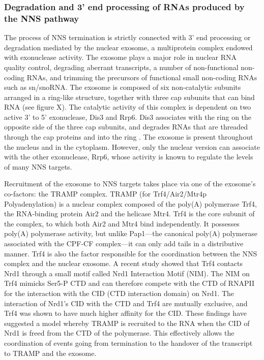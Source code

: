 \subsubsection{Degradation and 3' end processing of RNAs produced by the NNS pathway}

The process of NNS termination is strictly connected with 3' end processing or degradation mediated by the nuclear exosome, a multiprotein complex endowed with exonuclease activity. 
The exosome plays a major role in nuclear RNA quality control, degrading aberrant transcripts, a number of non-functional non-coding RNAs, and trimming the precursors of functional small non-coding RNAs such as sn/snoRNA. 
The exosome is composed of six non-catalytic subunits arranged in a ring-like structure, together with three cap subunits that can bind RNA (see figure X). 
The catalytic activity of this complex is dependent on two active 3' to 5' exonuclease, Dis3 and Rrp6. 
Dis3 associates with the ring on the opposite side of the three cap subunits, and degrades RNAs that are threaded through the cap proteins and into the ring \cite{makino:2015:rna}. 
The exosome is present throughout the nucleus and in the cytoplasm. 
However, only the nuclear version can associate with the other exonuclease, Rrp6, whose activity is known to regulate the levels of many NNS targets.

Recruitment of the exosome to NNS targets takes place via one of the exosome’s co-factors: the TRAMP complex. 
TRAMP (for Trf4/Air2/Mtr4p Polyadenylation) is a nuclear complex composed of the poly(A) polymerase Trf4, the RNA-binding protein Air2 and the helicase Mtr4. 
Trf4 is the core subunit of the complex, to which both Air2 and Mtr4 bind independently. 
It possesses poly(A) polymerase activity, but unlike Pap1—the canonical poly(A) polymerase associated with the CPF-CF complex—it can only add tails in a distributive manner. 
Trf4 is also the factor responsible for the coordination between the NNS complex and the nuclear exosome. 
A recent study showed that Trf4 contacts Nrd1 through a small motif called Nrd1 Interaction Motif (NIM). 
The NIM on Trf4 mimicks Ser5-P CTD and can therefore compete with the CTD of RNAPII for the interaction with the CID (CTD interaction domain) on Nrd1. 
The interaction of Nrd1’s CID with the CTD and Trf4 are mutually exclusive, and Trf4 was shown to have much higher affinity for the CID. 
These findings have suggested a model whereby TRAMP is recruited to the RNA when the CID of Nrd1 is freed from the CTD of the polymerase. 
This effectively allows the coordination of events going from termination to the handover of the transcript to TRAMP and the exosome.

